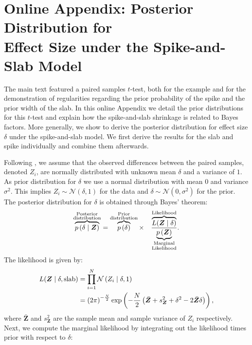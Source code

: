 \documentclass[a4paper]{article}
\newcommand{\DON}[1]{\todo[inline, color=white]{Don: #1}}
\newcommand{\shypo}[1]{%
	\ifnum#1>0%
		\mathrm{slab}
	\else%
		\mathrm{spike}
	\fi%
}
\newcommand{\model}{\mathcal{M}}
\newcommand{\data}{\mathrm{data}}%
\newcommand{\dataZ}	{\bm{Z}}
\newcommand{\dataZi}{Z_i}
\newcommand{\meanZ}	{\bar{\dataZ}}
\newcommand{\varZ}	{s_{\dataZ}^2}
\newcommand{\probp}[1]{p\left(#1\right)}
\newcommand{\lik}{L}
\newcommand{\dnorm}[2]{\mathcal{N}\left(#1, #2\right)}
\newcommand{\dnormc}[3]{\mathcal{N}\left(#1 \mid #2, #3\right)}
\newenvironment{revision}{\color{black}}{\color{black}}
\begin{document}
\printbibliography

\newpage
\appendix
\begin{revision}%

\section*{Online Appendix: Posterior Distribution for \\Effect Size under the Spike-and-Slab Model}


The main text featured a paired samples $t$-test, both for the example and for the demonstration of regularities regarding the prior probability of the spike and the prior width of the slab. In this online Appendix we detail the prior distributions for this $t$-test and explain how the spike-and-slab shrinkage is related to Bayes factors. More generally, we show to derive the posterior distribution for effect size $\delta$ under the spike-and-slab model. We first derive the results for the slab and spike individually and combine them afterwards. 

Following \textcite{RouderEtAl2018PBR}, we assume that the observed differences between the paired samples, denoted $\dataZi$, are normally distributed with unknown mean $\delta$ and a variance of $1$.
As prior distribution for $\delta$ we use a normal distribution with mean 0 and variance $\sigma^2$.
This implies $\dataZi\sim \dnorm{\delta}{1}$ for the data and $\delta\sim\dnorm{0}{\sigma^2}$ for the prior. The posterior distribution for $\delta$ is obtained through Bayes' theorem:
\begin{align*}%
\overbrace{\probp{\delta \mid \dataZ}}^{\substack{\text{Posterior}\\\text{distribution}}}
= 
\overbrace{\probp{\delta}}^{\substack{\text{Prior}\\ \text{distribution}}}
\times \quad
\frac{
	\overbrace{\lik(\dataZ \mid \delta)}^{\text{Likelihood}}
}{
	\underbrace{\probp{\dataZ}}_{\substack{\text{Marginal}\\ \text{Likelihood}}}
}.
\end{align*}
The likelihood is given by:
\begin{align*}
	\lik(\dataZ \mid \delta, \shypo{1}) &= \prod_{i=1}^{N} \dnormc{\dataZi}{\delta}{1}\\
							 &= \left(2\pi\right)^{-\frac{N}{2}}
							 \exp\left(-\frac{N}{2}\left(\meanZ + \varZ + \delta^2 -2\meanZ\delta\right)\right),
\end{align*}
where $\meanZ$ and $\varZ$ are the sample mean and sample variance of $\dataZi$ respectively. Next, we compute the marginal likelihood by integrating out the likelihood times prior with respect to $\delta$:


\end{revision}
\end{document}
